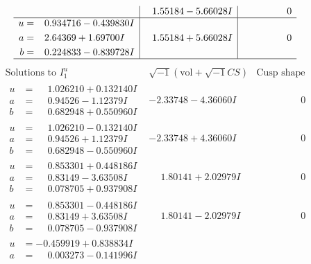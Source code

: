 \documentclass[1p]{elsarticle_modified}
\theoremstyle{definition}
\newcommand{\I}{\sqrt{-1}}
\begin{document}
$$\begin{array}{c|c|c}
 & \phantom{-}1.55184 - 5.66028 I & \phantom{-0.000000 } 0 \\ \hline\begin{aligned}
u &= \phantom{-}0.934716 - 0.439830 I \\
a &= \phantom{-}2.64369 + 1.69700 I \\
b &= \phantom{-}0.224833 - 0.839728 I\end{aligned}
 & \phantom{-}1.55184 + 5.66028 I & \phantom{-0.000000 } 0\\
 \hline 
 \end{array}$$\newpage$$\begin{array}{c|c|c}  
\text{Solutions to }I^u_{1}& \I (\text{vol} + \sqrt{-1}CS) & \text{Cusp shape}\\
 \hline 
\begin{aligned}
u &= \phantom{-}1.026210 + 0.132140 I \\
a &= \phantom{-}0.94526 - 1.12379 I \\
b &= \phantom{-}0.682948 + 0.550960 I\end{aligned}
 & -2.33748 - 4.36060 I & \phantom{-0.000000 } 0 \\ \hline\begin{aligned}
u &= \phantom{-}1.026210 - 0.132140 I \\
a &= \phantom{-}0.94526 + 1.12379 I \\
b &= \phantom{-}0.682948 - 0.550960 I\end{aligned}
 & -2.33748 + 4.36060 I & \phantom{-0.000000 } 0 \\ \hline\begin{aligned}
u &= \phantom{-}0.853301 + 0.448186 I \\
a &= \phantom{-}0.83149 - 3.63508 I \\
b &= \phantom{-}0.078705 + 0.937908 I\end{aligned}
 & \phantom{-}1.80141 + 2.02979 I & \phantom{-0.000000 } 0 \\ \hline\begin{aligned}
u &= \phantom{-}0.853301 - 0.448186 I \\
a &= \phantom{-}0.83149 + 3.63508 I \\
b &= \phantom{-}0.078705 - 0.937908 I\end{aligned}
 & \phantom{-}1.80141 - 2.02979 I & \phantom{-0.000000 } 0 \\ \hline\begin{aligned}
u &= -0.459919 + 0.838834 I \\
a &= \phantom{-}0.003273 - 0.141996 I \\

\end{aligned}
\end{array}$$
\end{document}
